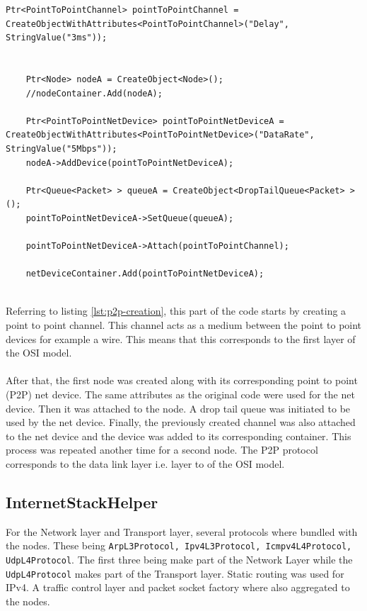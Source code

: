 \documentclass[a4paper, 12pt]{article}
\begin{document}
\begin{lstlisting}[caption=Creating a P2P net device, label=lst:p2p-creation]
	Ptr<PointToPointChannel> pointToPointChannel = CreateObjectWithAttributes<PointToPointChannel>("Delay", StringValue("3ms"));


    Ptr<Node> nodeA = CreateObject<Node>();
    //nodeContainer.Add(nodeA);

    Ptr<PointToPointNetDevice> pointToPointNetDeviceA = CreateObjectWithAttributes<PointToPointNetDevice>("DataRate", StringValue("5Mbps"));
    nodeA->AddDevice(pointToPointNetDeviceA);

    Ptr<Queue<Packet> > queueA = CreateObject<DropTailQueue<Packet> > ();
    pointToPointNetDeviceA->SetQueue(queueA);

    pointToPointNetDeviceA->Attach(pointToPointChannel);

    netDeviceContainer.Add(pointToPointNetDeviceA);


\end{lstlisting}
Referring to listing \ref{lst:p2p-creation}, this part of the code starts by creating a point to point channel. This channel acts as a medium between the point to point devices for example a wire. This means that this corresponds to the first layer of the OSI model. 

\paragraph{}
After that, the first node was created along with its corresponding point to point (P2P) net device. The same attributes as the original code were used for the net device. Then it was attached to the node. A drop tail queue was initiated to be used by the net device. Finally, the previously created channel was also attached to the net device and the device was added to its corresponding container. This process was repeated another time for a second node. The P2P protocol corresponds to the data link layer i.e. layer to of the OSI model.

\subsection{InternetStackHelper}
\label{sec:internetstackhelper}
For the Network layer and Transport layer, several protocols where bundled with the nodes. These being \texttt{ArpL3Protocol, Ipv4L3Protocol, Icmpv4L4Protocol, UdpL4Protocol}. The first three being make part of the Network Layer while the \texttt{UdpL4Protocol} makes part of the Transport layer. Static routing was used for IPv4. A traffic control layer and packet socket factory where also aggregated to the nodes.
\end{document}
